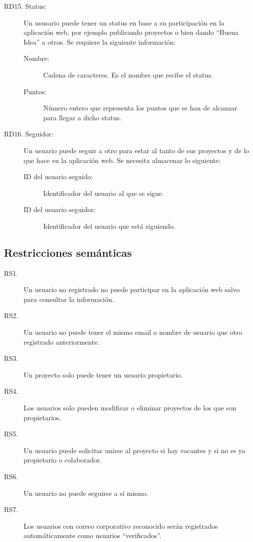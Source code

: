 \begin{description}
    \item[RD15. Status:] Un ususario puede tener un status en base a su participación en la aplicación web, por ejemplo publicando proyectos o bien dando ``Buena Idea'' a otros. Se requiere la siguiente información:
        \begin{description}
            \item[Nombre:] Cadena de caracteres. Es el nombre que recibe el status.
            \item[Puntos:] Número entero que representa los puntos que se han de alcanzar para llegar a dicho status.
        \end{description}
    \item[RD16. Seguidor:] Un usuario puede seguir a otro para estar al tanto de sus proyectos y de lo que hace en la aplicación web. Se necesita almacenar lo siguiente:
        \begin{description}
            \item[ID del usuario seguido:] Identificador del usuario al que se sigue.
            \item[ID del usuario seguidor:] Identificador del usuario que está siguiendo.
        \end{description}
\end{description}

\subsection*{Restricciones semánticas}
\begin{description}
    \item[RS1.] Un usuario no registrado no puede participar en la aplicación web salvo para consultar la información.
    \item[RS2.] Un usuario no puede tener el mismo email o nombre de usuario que otro registrado anteriormente.
    \item[RS3.] Un proyecto solo puede tener un usuario propietario.
    \item[RS4.] Los usuarios solo pueden modificar o eliminar proyectos de los que son propietarios.
    \item[RS5.] Un usuario puede solicitar unirse al proyecto si hay vacantes y si no es ya propietario o colaborador.
    \item[RS6.] Un usuario no puede seguirse a sí mismo.
    \item[RS7.] Los usuarios con correo corporativo reconocido serán registrados automáticamente como usuarios ``verificados''.
\end{description}

